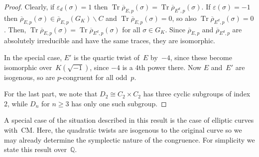 \documentclass[12pt, reqno]{amsart}
\newcommand{\Q}{\mathbb{Q}}
\newcommand{\rhobar}{{\overline{\rho}}}
\newcommand{\eps}{\varepsilon}
\DeclareMathOperator{\Tr}{Tr}
\numberwithin{equation}{section}
\theoremstyle{definition}
\theoremstyle{remark}
\begin{document}
\begin{proof}
Clearly, if $\eps_d(\sigma)=1$ then $\Tr \rhobar_{E,p}(\sigma) = \Tr \rhobar_{E^d,p}(\sigma)$. 
If $\eps(\sigma) = -1$ then $\rhobar_{E,p}(\sigma) \in \rhobar_{E,p} (G_K) \backslash C$ and $\Tr \rhobar_{E,p}(\sigma) = 0$, so also $\Tr \rhobar_{E^d,p}(\sigma) = 0$.
Then, $\Tr \rhobar_{E,p}(\sigma) = \Tr \rhobar_{E^d,p}(\sigma)$ 
for all $\sigma \in G_K$. 
Since $\rhobar_{E,p}$ and $\rhobar_{E^d,p}$ are absolutely irreducible
and have the same traces, they are isomorphic.

In the special case, $E'$ is the quartic twist of~$E$ by~$-4$, since
these become isomorphic over~$K(\sqrt{-1})$, since $-4$ is a $4$th
power there.  Now $E$ and~$E'$ are isogenous, so are $p$-congruent for
all odd~$p$.

For the last part, we note that $D_2\cong C_2\times C_2$ has three
cyclic subgroups of index~$2$, while $D_n$ for $n\ge3$ has only one
such subgroup.
\end{proof}


A special case of the situation described in this result is the case
of elliptic curves with~CM.  Here, the quadratic twists are isogenous
to the original curve so we may already determine the symplectic nature
of the congruence.  For simplicity we state this result over~$\Q$.
\end{document}
